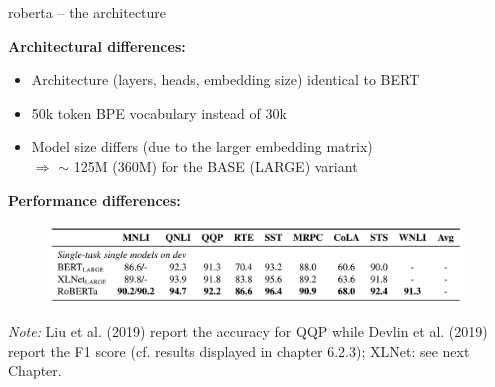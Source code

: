 \begin{frame}{roberta -- the architecture}

\textbf{Architectural differences:}

\begin{itemize}
\item Architecture (layers, heads, embedding size) identical to BERT
\item 50k token BPE vocabulary instead of 30k
\item Model size differs (due to the larger embedding matrix)\\
			$\Rightarrow$ $\sim$ 125M (360M) for the BASE (LARGE) variant 
\end{itemize}

\textbf{Performance differences:}

\begin{figure}
\centering
\includegraphics[width = 11cm]{figure/roberta-sota.png}\\ 
\end{figure}

\vfill

\scriptsize
\textit{Note:} Liu et al. (2019) report the accuracy for QQP while Devlin et al. (2019) report the F1 score (cf. results displayed in chapter 6.2.3); XLNet: see next Chapter.

\end{frame}


